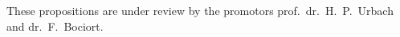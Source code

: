 \documentclass{dissertation}
\begin{document}
\bigskip
\bigskip

\begin{center}
\small These propositions are under review by the promotors prof.\ dr.\ H.\ P.\ Urbach and dr.\ F.\  Bociort.
\end{center}

\begin{comment}
\begin{center}
These propositions are regarded as opposable and defendable, and have been approved as such by the supervisor prof.\ dr.\ ???.\ ???
\end{center}
\end{comment}

\begin{comment}
\clearpage
{\selectlanguage{dutch}

\begin{center}

{\Large\titlefont\bfseries Stellingen}

\bigskip

behorende bij het proefschrift

\bigskip

{\makeatletter
\titlestyle\bfseries\large\@title
\makeatother}

{\makeatletter
\ifx\@subtitle\undefined\else
    \titlefont\titleshape\@subtitle
\fi
\makeatother}

\bigskip

door

\bigskip

\makeatletter
{\large\titlefont\bfseries\@firstname\ {\titleshape\@lastname}}
\makeatother

\end{center}

\bigskip
\bigskip

\begin{enumerate}

\item Stelling 1.
\item Stelling 2.
\item Stelling 3.
\item Stelling 4.
\item Stelling 5.
\item Stelling 6.
\item Stelling 7.
\item Stelling 8.
\item Stelling 9.
\item Stelling 10.


\end{comment}
\end{document}
